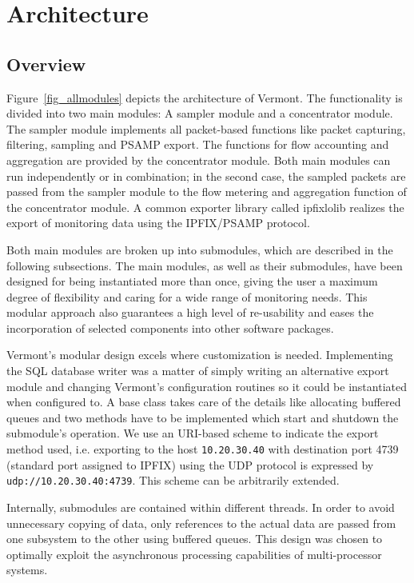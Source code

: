 \section{Architecture}
\label{sec:architecture}

\subsection{Overview}

Figure~\ref{fig_allmodules} depicts the architecture of Vermont.
The functionality is divided into two main modules: A sampler module and a concentrator module.
The sampler module implements all packet-based functions like packet capturing, filtering, sampling and PSAMP export.
The functions for flow accounting and aggregation are provided by the concentrator module.
Both main modules can run independently or in combination; in the second case, the sampled packets are passed from the sampler module to the flow metering and aggregation function of the concentrator module.
A common exporter library called ipfixlolib realizes the export of monitoring data using the IPFIX/PSAMP protocol.

Both main modules are broken up into submodules, which are described in the following subsections.
The main modules, as well as their submodules, have been designed for being instantiated more than once, giving the user a maximum degree of flexibility and caring for a wide range of monitoring needs.
This modular approach also guarantees a high level of re-usability and eases the incorporation of selected components into other software packages.

Vermont's modular design excels where customization is needed.
Implementing the SQL database writer was a matter of simply writing an alternative export module and changing Vermont's configuration routines so it could be instantiated when configured to.
A base class takes care of the details like allocating buffered queues and two methods have to be implemented which start and shutdown the submodule's operation.
We use an URI-based scheme to indicate the export method used, i.e. exporting to the host \texttt{10.20.30.40} with destination port 4739 (standard port assigned to IPFIX) using the UDP protocol is expressed by \texttt{udp://10.20.30.40:4739}. This scheme can be arbitrarily extended.

Internally, submodules are contained within different threads.
In order to avoid unnecessary copying of data, only references to the actual data are passed from one subsystem to the other using buffered queues.
This design was chosen to optimally exploit the asynchronous processing capabilities of multi-processor systems.

